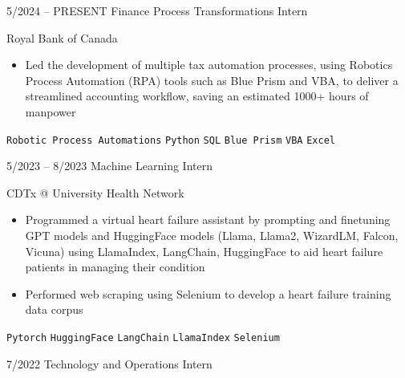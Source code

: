 \documentclass[9pt]{developercv} %
\begin{document}
\vspace{-10 pt}
\begin{entrylist}
    \entry
        {5/2024 -- PRESENT}
		{Finance Process Transformations Intern}
		{}
		{\vspace{-10pt}
  
       Royal Bank of Canada
        \vspace{5pt}
        \begin{itemize}[noitemsep,topsep=0pt,parsep=0pt,partopsep=0pt, leftmargin=-1pt]
            \item Led the development of multiple tax automation processes, using Robotics Process Automation (RPA) tools such as Blue Prism and VBA, to deliver a streamlined accounting workflow,  saving an estimated 1000+ hours of manpower
        \end{itemize} 
        \vspace{5pt}
        \texttt{Robotic Process Automations} \slashsep \texttt{Python} \slashsep \texttt{SQL} \slashsep \texttt{Blue Prism} \slashsep \texttt{VBA} \slashsep \texttt{Excel}}
	\entry
        {5/2023 -- 8/2023}
		{Machine Learning Intern}
		{}
		{\vspace{-10pt}
  
        CDTx @ University Health Network
        \vspace{5pt}
        \begin{itemize}[noitemsep,topsep=0pt,parsep=0pt,partopsep=0pt, leftmargin=-1pt]
            \item Programmed a virtual heart failure assistant by prompting and finetuning GPT models and HuggingFace models (Llama, Llama2, WizardLM, Falcon, Vicuna) using LlamaIndex, LangChain, HuggingFace to aid heart failure patients in managing their condition
            \item Performed web scraping using Selenium to develop a heart failure training data corpus
        \end{itemize} 
        \vspace{5pt}
        \texttt{Pytorch} \slashsep \texttt{HuggingFace} \slashsep \texttt{LangChain} \slashsep \texttt{LlamaIndex} \slashsep \texttt{Selenium}}
        \entry
        {7/2022}
		{Technology and Operations Intern}
		{}
		{\vspace{-10pt}
  
}
\end{entrylist}
\end{document}
